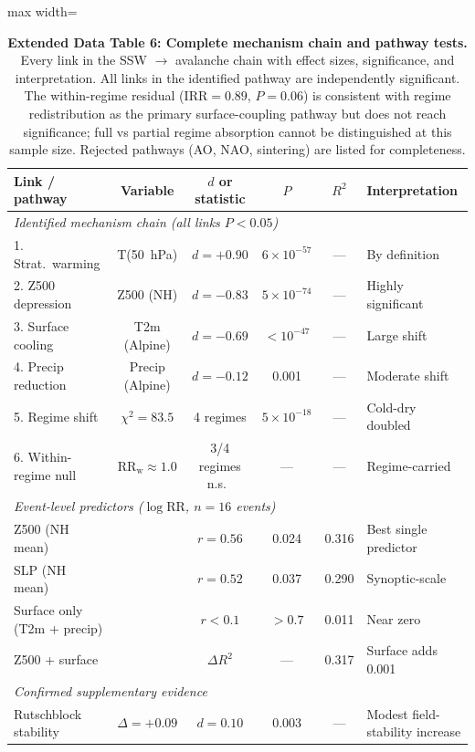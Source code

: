 \documentclass[11pt,letterpaper]{article}
\begin{document}
\begin{table}[!ht]
\centering
\caption{\textbf{Extended Data Table 6: Complete mechanism chain and pathway tests.}
Every link in the SSW $\to$ avalanche chain with effect sizes, significance, and interpretation. All links in the identified pathway are independently significant. The within-regime residual ($\mathrm{IRR} = 0.89$, $P = 0.06$) is consistent with regime redistribution as the primary surface-coupling pathway but does not reach significance; full vs partial regime absorption cannot be distinguished at this sample size. Rejected pathways (AO, NAO, sintering) are listed for completeness.}
\label{tab:mechanism}
\small
\begin{adjustbox}{max width=\textwidth}
\begin{tabular}{lccccl}
\toprule
Link / pathway & Variable & $d$ or statistic & $P$ & $R^2$ & Interpretation \\
\midrule
\multicolumn{6}{l}{\textit{Identified mechanism chain (all links $P < 0.05$)}} \\
1. Strat.\ warming & T(50~hPa) & $d = +0.90$ & $6 \times 10^{-57}$ & --- & By definition \\
2. Z500 depression & Z500 (NH) & $d = -0.83$ & $5 \times 10^{-74}$ & --- & Highly significant \\
3. Surface cooling & T2m (Alpine) & $d = -0.69$ & $< 10^{-47}$ & --- & Large shift \\
4. Precip reduction & Precip (Alpine) & $d = -0.12$ & 0.001 & --- & Moderate shift \\
5. Regime shift & $\chi^2 = 83.5$ & 4 regimes & $5 \times 10^{-18}$ & --- & Cold-dry doubled \\
6. Within-regime null & $\mathrm{RR}_\mathrm{w} \approx 1.0$ & 3/4 regimes n.s.\ & --- & --- & Regime-carried \\
\midrule
\multicolumn{6}{l}{\textit{Event-level predictors ($\log\mathrm{RR}$, $n = 16$ events)}} \\
Z500 (NH mean) & & $r = 0.56$ & 0.024 & 0.316 & Best single predictor \\
SLP (NH mean) & & $r = 0.52$ & 0.037 & 0.290 & Synoptic-scale \\
Surface only (T2m + precip) & & $r < 0.1$ & $> 0.7$ & 0.011 & Near zero \\
Z500 + surface & & $\Delta R^2$ & --- & 0.317 & Surface adds 0.001 \\
\midrule
\multicolumn{6}{l}{\textit{Confirmed supplementary evidence}} \\
Rutschblock stability & $\Delta = +0.09$ & $d = 0.10$ & 0.003 & --- & Modest field-stability increase \\

\end{tabular}
\end{adjustbox}
\end{table}
\end{document}
